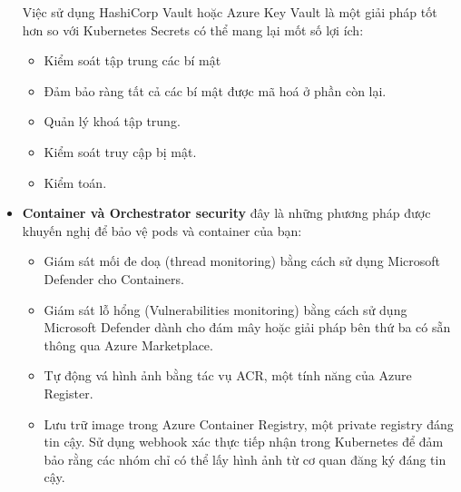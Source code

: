 \begin{itemize}
\begin{itemize}
        \end{itemize}
    Việc sử dụng HashiCorp Vault hoặc Azure Key Vault là một giải pháp tốt hơn so với Kubernetes Secrets có thể mang lại mốt số lợi ích:
        \begin{itemize}
            \item Kiểm soát tập trung các bí mật
            \item Đảm bảo ràng tất cả các bí mật được mã hoá ở phần còn lại.
            \item Quản lý khoá tập trung.
            \item Kiểm soát truy cập bị mật.
            \item Kiểm toán.
        \end{itemize}
    \item \textbf{Container và Orchestrator security} đây là những phương pháp được khuyến nghị để bảo vệ pods và container của bạn:
        \begin{itemize}
            \item Giám sát mối đe doạ (thread monitoring) bằng cách sử dụng Microsoft Defender cho Containers.
            \item Giám sát lỗ hổng (Vulnerabilities monitoring) bằng cách sử dụng Microsoft Defender dành cho đám mây hoặc giải pháp bên thứ ba có sẵn thông qua Azure Marketplace.
            \item Tự động vá hình ảnh bằng tác vụ ACR, một tính năng của Azure Register. 
            \item Lưu trữ image trong Azure Container Registry, một private registry đáng tin cậy. Sử dụng webhook xác thực tiếp nhận trong Kubernetes để đảm bảo rằng các nhóm chỉ có thể lấy hình ảnh từ cơ quan đăng ký đáng tin cậy.
        \end{itemize}
      
\end{itemize}
\newpage
